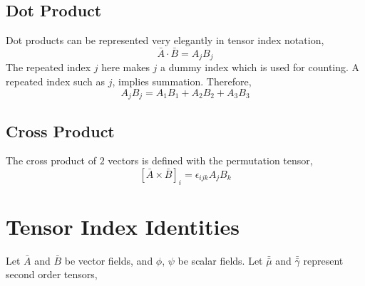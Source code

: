 \subsection{Dot Product}
\begin{comment}
\end{comment}
Dot products can be represented very elegantly in tensor index notation,
$$\bar{A}\cdot\bar{B} = A_{j}B_{j}$$
The repeated index $j$ here makes $j$ a dummy index which is used for counting. A repeated index such as $j$, implies summation. Therefore,
$$A_{j}B_{j} = A_{1}B_{1}+A_{2}B_{2}+A_{3}B_{3}$$
\subsection{Cross Product}
\begin{comment}
\end{comment}
The cross product of $2$ vectors is defined with the permutation tensor,
$$\left[\bar{A}\times\bar{B}\right]_{i} = \epsilon_{ijk}A_{j}B_{k}$$
\section{Tensor Index Identities}
\begin{comment}
\end{comment}
Let $\bar{A}$ and $\bar{B}$ be vector fields, and $\phi$, $\psi$ be scalar fields. Let $\bar{\bar{\mu}}$ and $\bar{\bar{\gamma}}$ represent second order tensors,
